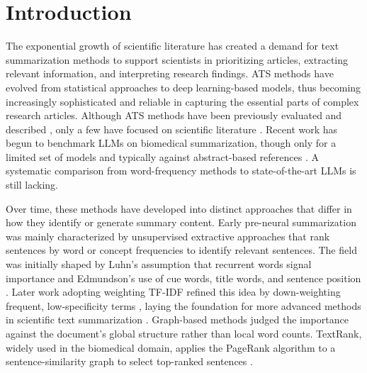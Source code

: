 \section{Introduction}

The exponential growth of scientific literature has created a demand for text summarization methods to support scientists in prioritizing articles, extracting relevant information, and interpreting research findings. \ac{ATS} methods have evolved from statistical approaches to deep learning-based models, thus becoming increasingly sophisticated and reliable in capturing the essential parts of complex research articles. Although \ac{ATS} methods have been previously evaluated and described  \cite{zhang2025comprehensivesurveyprocessorientedautomatic,zhang2024systematicsurveytextsummarization}, only a few have focused on scientific literature \cite{ROHIL2022100058,xie2023surveybiomedicaltextsummarization}. Recent work has begun to benchmark \acp{LLM} on biomedical summarization, though only for a limited set of models and typically against abstract-based references \cite{chen2025benchmarking,celikten2025benchmarking,toprak2025benchmarking}. A systematic comparison from word-frequency methods to state-of-the-art \acp{LLM} is still lacking.

Over time, these methods have developed into distinct approaches that differ in how they identify or generate summary content. Early pre-neural summarization was mainly characterized by unsupervised extractive approaches that rank sentences by word or concept frequencies to identify relevant sentences. The field was initially shaped by Luhn's assumption that recurrent words signal importance   \cite{Luhn1958TheAC} and Edmundson's use of cue words, title words, and sentence position \cite{10.1145/321510.321519}. Later work adopting weighting \ac{TF-IDF} refined this idea by down-weighting frequent, low-specificity terms \cite{article}, laying the foundation for more advanced methods in scientific text summarization \cite{10.1145/1183614.1183701}. Graph-based methods judged the importance against the document's global structure rather than local word counts. TextRank, widely used in the biomedical domain, applies the PageRank algorithm to a sentence-similarity graph to select top-ranked sentences \cite{mihalcea-tarau-2004-textrank}. 

